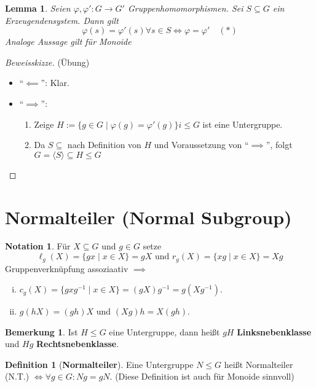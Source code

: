\documentclass[a4paper]{article}
\theoremstyle{plain}
\newtheorem{lemm}[thm]{Lemma}
\theoremstyle{definition}
\newtheorem{defi}[thm]{Definition}
\newtheorem*{bem*}{Bemerkung}
\newtheorem*{nota*}{Notation}
\begin{document}
\begin{lemm}
  Seien $\varphi, \varphi' : G \to G'$ Gruppenhomomorphismen. Sei $S \subseteq G$ ein Erzeugendensystem. Dann gilt
  $$\varphi(s) = \varphi'(s) \forall s \in S \iff \varphi = \varphi'\quad (*)$$
  Analoge Aussage gilt für Monoide
\end{lemm}
\begin{proof}[Beweisskizze](Übung)
  \begin{itemize}
          \item ``$\impliedby$'': Klar.
    \item ``$\implies$'':
          \begin{enumerate}[1)]
            \item Zeige $H := \{g \in G \mid \varphi(g) = \varphi'(g)\}i \le G$ ist eine Untergruppe.
            \item Da $S \subseteq$ nach Definition von $H$ und Voraussetzung von ``$\implies$'', folgt $G = \langle S \rangle \subseteq H \le G$
          \end{enumerate}
  \end{itemize}
\end{proof}
\section*{Normalteiler (Normal Subgroup)}
\begin{nota*}
  Für $X \subseteq G$ und $g \in G$ setze $$\ell_{g}(X) = \{gx \mid x \in X\} = gX \text{ und } r_{g}(X) = \{xg \mid x \in X\} = Xg$$
  Gruppenverknüpfung assoziaativ $\implies$
  \begin{enumerate}[(i)]
    \item $c_{g}(X) = \{gxg^{-1} \mid x \in X\} = (gX)g^{-1} = g(Xg^{-1})$.
    \item $g(hX) = (gh)X$ und $(Xg)h = X(gh)$.
  \end{enumerate}
\end{nota*}

\begin{bem*} Ist $H \le G$ eine Untergruppe, dann heißt $gH$ \textbf{Linksnebenklasse} und $Hg$ \textbf{Rechtsnebenklasse}.
\end{bem*}

\begin{defi}[\textbf{Normalteiler}]
  Eine Untergruppe $N \le G$ heißt Normalteiler (N.T.) $\iff \forall g \in G : Ng = gN$. (Diese Definition ist auch für Monoide sinnvoll)
\end{defi}
\end{document}
